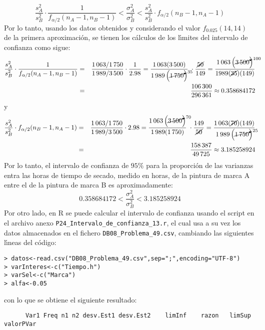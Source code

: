 \begin{solucion}
 \begin{equation*}
  \frac{s_A^2}{s_B^2}\cdot \frac{1}{f_{\alpha/2}(n_A-1,n_B-1)} < \frac{\sigma_A^2}{\sigma_B^2} < \frac{s_A^2}{s_B^2} \cdot f_{\alpha/2}(n_B-1,n_A-1)
 \end{equation*}
 Por lo tanto, usando los datos obtenidos y considerando el valor $f_{0.025}(14,14)$ de la primera aproximaci\'on, se tienen los c\'alculos de los l\'{\i}mites del intervalo de confianza como sigue:
 \begin{eqnarray*}
  \frac{s_A^2}{s_B^2}\cdot \frac{1}{f_{\alpha/2}(n_A-1,n_B-1)} & = & \frac{1\,063/1\,750}{1\,989/3\,500} \cdot \frac{1}{2.98} = \frac{1\,063(3\,500)}{1\,989\left( \cancelto{35}{1\,750} \right)} \; \cdot \frac{\cancel{50}}{149} = \frac{1\,063\left( \cancelto{100}{3\,500} \right)}{1989(\cancel{35})(149)} \\
  & = & \frac{106\,300}{296\,361} \approx 0.358684172
 \end{eqnarray*}
 y
 \begin{eqnarray*}
  \frac{s_A^2}{s_B^2} \cdot f_{\alpha/2}(n_B-1,n_A-1) & = & \frac{1\,063/1\,750}{1\,989/3\,500} \cdot 2.98 = \frac{1\,063\left( \cancelto{70}{3\,500} \right)}{1\,989(1\,750)} \; \cdot \frac{149}{\cancel{50}} = \frac{1\,063(\cancel{70})(149)}{1\,989\left( \cancelto{25}{1\,750} \right)} \\
  & = & \frac{158\,387}{49\,725} \approx 3.185258924
 \end{eqnarray*}
 Por lo tanto, el intervalo de confianza de $95\%$ para la proporci\'on de las varianzas entra las horas de tiempo de secado, medido en horas, de la pintura de marca A entre el de la pintura de marca B es aproximadamente:
 \begin{equation*}
  0.358684172 < \frac{\sigma_A^2}{\sigma_B^2} < 3.185258924
 \end{equation*}
 Por otro lado, en R se puede calcular el intervalo de confianza usando el script en el archivo anexo \texttt{P24\_Intervalo\_de\_confianza\_13.r}, el cual usa a su vez los datos almacenados en el fichero \texttt{DB08\_Problema\_49.csv}, cambiando las siguientes l\'{\i}neas del c\'odigo:
 \begin{verbatim}
> datos<-read.csv("DB08_Problema_49.csv",sep=";",encoding="UTF-8")
> varInteres<-c("Tiempo.h")
> varSel<-c("Marca")
> alfa<-0.05
 \end{verbatim}
 \vspace{-0.5cm}
 con lo que se obtiene el siguiente resultado:
 \begin{verbatim}
      Var1 Freq n1 n2 desv.Est1 desv.Est2    limInf    razon   limSup valorPVar

\end{verbatim}
\end{solucion}
